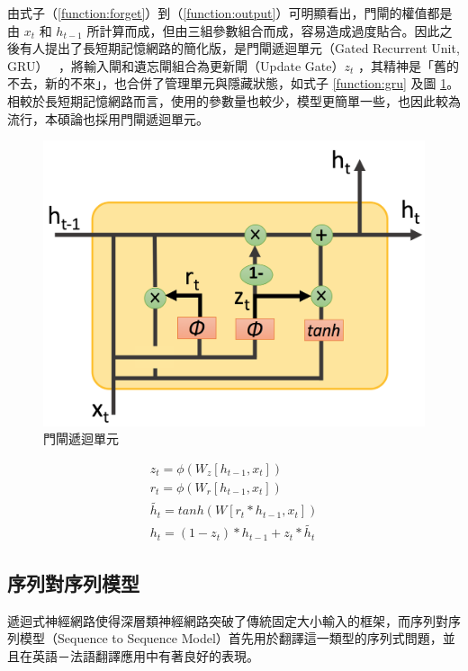 由式子（\ref{function:forget}）到（\ref{function:output}）可明顯看出，門閘的權值都是由 $x_t$ 和 $h_{t-1}$ 所計算而成，但由三組參數組合而成，容易造成過度貼合。因此之後有人提出了長短期記憶網路的簡化版，是門閘遞迴單元（Gated Recurrent Unit, GRU）~\cite{cho2014learning} ，將輸入閘和遺忘閘組合為更新閘（Update Gate）$z_t$ ，其精神是「舊的不去，新的不來」，也合併了管理單元與隱藏狀態，如式子 \ref{function:gru} 及圖 \ref{fig:gru}。相較於長短期記憶網路而言，使用的參數量也較少，模型更簡單一些，也因此較為流行，本碩論也採用門閘遞迴單元。
\begin{figure}[h]
    \centering
    \includegraphics[scale=0.35]{images/chap2_gru.png}
    \caption{門閘遞迴單元}\label{fig:gru}
\end{figure}
\begin{equation}
    \label{function:gru}
    \begin{aligned}
        z_t = \phi(W_z [h_{t-1},x_t]) \\
        r_t = \phi(W_r [h_{t-1},x_t]) \\
        \tilde{h_t} = tanh(W[r_t*h_{t-1},x_t]) \\
        h_t = (1-z_t) * h_{t-1} + z_t * \tilde{h_t}
\end{aligned}
\end{equation}
\subsection{序列對序列模型}
遞迴式神經網路使得深層類神經網路突破了傳統固定大小輸入的框架，而序列對序列模型（Sequence to Sequence Model）首先用於翻譯這一類型的序列式問題，並且在英語－法語翻譯應用中有著良好的表現。

